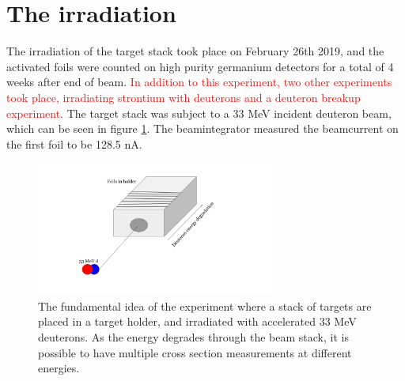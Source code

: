 



\section{The irradiation} \label{sec:experiment}
The irradiation of the target stack took place on February 26th 2019, and the activated foils were counted on high purity germanium detectors for a total of 4 weeks after end of beam. \textcolor{red}{In addition to this experiment, two other experiments took place, irradiating strontium with deuterons and a deuteron breakup experiment}. The target stack was subject to a 33 MeV incident deuteron beam, which can be seen in figure \ref{fig:experiment_illustration}. The beamintegrator measured the beamcurrent on the first foil to be 128.5 nA.     \\

\begin{figure}
    \centering
    \includegraphics[width=0.7\textwidth]{Experiment/Illustration_beamOnTarget.png}
    \caption{The fundamental idea of the experiment where a stack of targets are placed in a target holder, and irradiated with accelerated 33 MeV deuterons. As the energy degrades through the beam stack, it is possible to have multiple cross section measurements at different energies.}
    \label{fig:experiment_illustration}
\end{figure}

